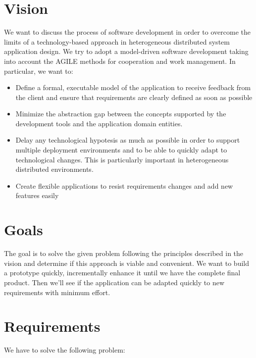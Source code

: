 \documentclass{llncs}
\newcommand{\labelsec}[1]{\label{sec:#1}}
\begin{document}
\section{Vision}
\labelsec{Vision}
We want to discuss the process of software development in order to overcome the limits of a technology-based approach in heterogeneous distributed system application design.
We try to adopt a model-driven software development taking into account the AGILE methods for cooperation and work management.
In particular, we want to:
\begin{itemize}
\item Define a formal, executable model of the application to receive feedback from the client and ensure that requirements are clearly defined as soon as possible 
\item Minimize the abstraction gap between the concepts supported by the development tools and the application domain entities.
\item Delay any technological hypotesis as much as possible in order to support multiple deployment environments and to be able to quickly adapt to technological changes. This is particularly important in heterogeneous distributed environments.
\item Create flexible applications to resist requirements changes and add new features easily
\end{itemize}
\section{Goals}
\labelsec{Goals}
The goal is to solve the given problem following the principles described in the vision and determine if this approach is viable and convenient. We want to build a prototype quickly, incrementally enhance it until we have the complete final product. Then we'll see if the application can be adapted quickly to new requirements with minimum effort.
\section{Requirements}
\labelsec{Requirements}
We have to solve the following problem:
\end{document}
